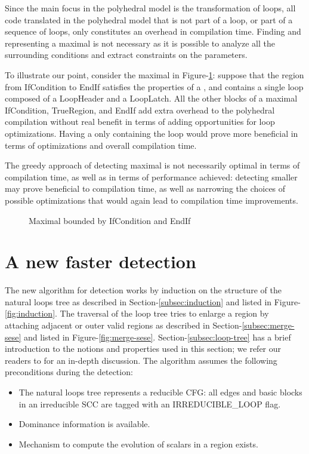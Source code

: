 \documentclass{sig-alternate}
\begin{document}
Since the main focus in the polyhedral model is the transformation of loops, all
code translated in the polyhedral model that is not part of a loop, or part of a
sequence of loops, only constitutes an overhead in compilation time.  Finding and
representing a maximal \SCoP{} is not necessary as it is possible to analyze all
the surrounding conditions and extract constraints on the parameters.

To illustrate our point, consider the maximal \SCoP{} in
Figure-\ref{fig:maximality}: suppose that the region from IfCondition to EndIf
satisfies the properties of a \SCoP{}, and contains a single loop composed of a
LoopHeader and a LoopLatch.  All the other blocks of a maximal \SCoP{}
IfCondition, TrueRegion, and EndIf add extra overhead to the polyhedral
compilation without real benefit in terms of adding opportunities for loop
optimizations.  Having a \SCoP{} only containing the loop would prove more
beneficial in terms of optimizations and overall compilation time.

The greedy approach of detecting maximal  is not necessarily optimal in
terms of compilation time, as well as in terms of performance achieved:
detecting smaller  may prove beneficial to compilation time, as well as
narrowing the choices of possible optimizations that would again lead to
compilation time improvements.

\begin{figure}
\centering
\caption{Maximal \SCoP{} bounded by IfCondition and EndIf}
\label{fig:maximality}
\end{figure}

\section{A new faster \SCoP{} detection}
\label{sec:new-SCoP-detection}
The new algorithm for \SCoP{} detection works by induction on the structure of the
natural loops tree as described in Section-\ref{subsec:induction} and listed in
Figure-\ref{fig:induction}.  The traversal of the loop tree tries to enlarge a
region by attaching adjacent or outer valid regions as described in
Section-\ref{subsec:merge-sese} and listed in Figure-\ref{fig:merge-sese}.
Section-\ref{subsec:loop-tree} has a brief introduction to the notions and
properties used in this section; we refer our readers to \cite{ramalingam} for
an in-depth discussion.  The algorithm assumes the following preconditions
during the \SCoP{} detection:
\begin{itemize}
\item The natural loops tree represents a reducible CFG: all edges and basic
  blocks in an irreducible SCC are tagged with an IRREDUCIBLE\_LOOP flag.
\item Dominance information is available.
\item Mechanism to compute the evolution of scalars in a region exists.
\end{itemize}
\end{document}
